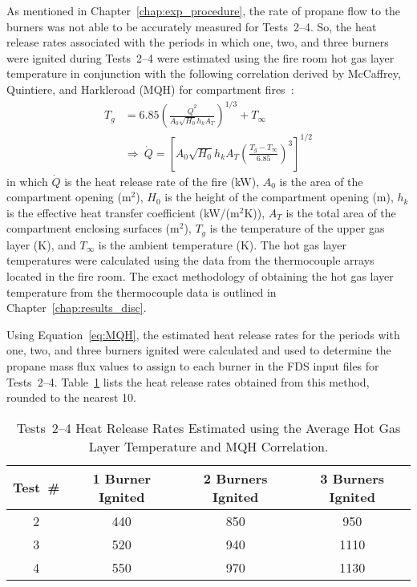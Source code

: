 As mentioned in Chapter~\ref{chap:exp_procedure}, the rate of propane flow to the burners was not able to be accurately measured for Tests~2--4. So, the heat release rates associated with the periods in which one, two, and three burners were ignited during Tests~2--4 were estimated using the fire room hot gas layer temperature in conjunction with the following correlation derived by McCaffrey, Quintiere, and Harkleroad (MQH) for compartment fires~\cite{McCaffrey:1}: 
\begin{equation}
\label{eq:MQH}
\begin{split}
  T_g &= 6.85 \left( \frac{\dot{Q}^2}{A_0 \sqrt{H_0} h_k A_T}\right)^{1/3}+T_{\infty} \\
  &\Rightarrow~\dot{Q} = \left[A_0  \sqrt{H_0} h_k A_T \left( \frac{T_g-T_{\infty}}{6.85}\right)^3\right]^{1/2}
\end{split}
\end{equation}
in which $\dot{Q}$ is the heat release rate of the fire (kW), $A_0$ is the area of the compartment opening (m$^2$), $H_0$ is the height of the compartment opening (m), $h_k$ is the effective heat transfer coefficient (kW/(m$^2$K)), $A_T$ is the total area of the compartment enclosing surfaces (m$^2$), $T_g$ is the temperature of the upper gas layer (K), and $T_{\infty}$ is the ambient temperature (K). The hot gas layer temperatures were calculated using the data from the thermocouple arrays located in the fire room. The exact methodology of obtaining the hot gas layer temperature from the thermocouple data is outlined in Chapter~\ref{chap:results_disc}. 

Using Equation~\ref{eq:MQH}, the estimated heat release rates for the periods with one, two, and three burners ignited were calculated and used to determine the propane mass flux values to assign to each burner in the FDS input files for Tests~2--4. Table~\ref{table:test_over} lists the heat release rates obtained from this method, rounded to the nearest 10.

\begin{table}[!ht]
\caption[Tests~2--4 Estimated Heat Release Rates Using MQH Correlation.]{Tests~2--4 Heat Release Rates Estimated using the Average Hot Gas Layer Temperature and MQH Correlation.}
\begin{center}
\begin{tabular}{cccc}
\toprule
\textbf{Test~\#} & \textbf{1 Burner Ignited} & \textbf{2 Burners Ignited} & \textbf{3 Burners Ignited}  \\
\midrule
2 & 440 & 850 & 950 \\
3 & 520 & 940 & 1110 \\
4 & 550 & 970 & 1130 \\
\hline
\end{tabular}
\end{center}
\label{table:test_over}
\end{table}

